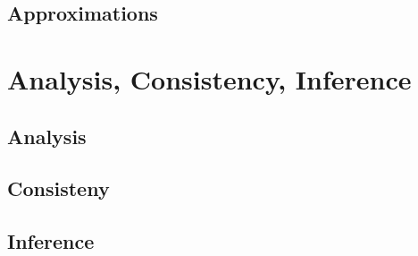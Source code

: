 \documentclass{article}
\theoremstyle{definition}
\theoremstyle{plain}
\begin{document}
\subsection{Approximations}

\section{Analysis, Consistency, Inference}

\subsection{Analysis}

\subsection{Consisteny}

\subsection{Inference}
\end{document}
